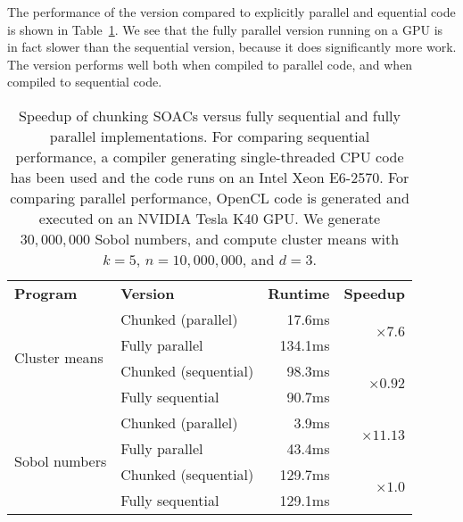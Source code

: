 The performance of the \StreamRed{} version compared to explicitly
parallel and equential code is shown in
Table~\ref{tab:streaming-perf}.  We see that the fully parallel
version running on a GPU is in fact slower than the sequential
version, because it does significantly more work.  The \StreamRed{}
version performs well both when compiled to parallel code, and when
compiled to sequential code.

\begin{table}
  \centering
  \begin{tabular}{llrr}
    \textbf{Program} & \textbf{Version}  & \textbf{Runtime} & \textbf{Speedup} \\
\multirow{4}{*}{Cluster means} & Chunked (parallel) & 17.6ms & \multirow{2}{*}{$\times7.6$} \\
& Fully parallel & 134.1ms & \\\cline{2-4}
& Chunked (sequential) & 98.3ms & \multirow{2}{*}{$\times0.92$} \\
& Fully sequential & 90.7ms & \\\hline

\multirow{4}{*}{Sobol numbers} & Chunked (parallel) & 3.9ms & \multirow{2}{*}{$\times11.13$} \\
& Fully parallel & 43.4ms & \\\cline{2-4}
& Chunked (sequential) & 129.7ms & \multirow{2}{*}{$\times1.0$} \\
& Fully sequential & 129.1ms & \\
  \end{tabular}
  \caption{Speedup of chunking SOACs versus fully sequential and
    fully parallel implementations.  For comparing sequential
    performance, a compiler generating single-threaded CPU code has
    been used and the code runs on an Intel Xeon E6-2570.  For
    comparing parallel performance, OpenCL code is generated and
    executed on an NVIDIA Tesla K40 GPU.  We generate $30,000,000$
    Sobol numbers, and compute cluster means with
    $k=5$, $n=10,000,000$, and $d=3$.}
  \label{tab:streaming-perf}
\end{table}


